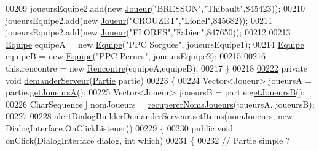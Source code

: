 \begin{DoxyCode}
00209         joueursEquipe2.add(\textcolor{keyword}{new} \hyperlink{classcom_1_1example_1_1area_1_1_joueur}{Joueur}(\textcolor{stringliteral}{"BRESSON"},\textcolor{stringliteral}{"Thibault"},845423));
00210         joueursEquipe2.add(\textcolor{keyword}{new} \hyperlink{classcom_1_1example_1_1area_1_1_joueur}{Joueur}(\textcolor{stringliteral}{"CROUZET"},\textcolor{stringliteral}{"Lionel"},845682));
00211         joueursEquipe2.add(\textcolor{keyword}{new} \hyperlink{classcom_1_1example_1_1area_1_1_joueur}{Joueur}(\textcolor{stringliteral}{"FLORES"},\textcolor{stringliteral}{"Fabien"},847650));
00212 
00213         \hyperlink{classcom_1_1example_1_1area_1_1_equipe}{Equipe} equipeA = \textcolor{keyword}{new} \hyperlink{classcom_1_1example_1_1area_1_1_equipe}{Equipe}(\textcolor{stringliteral}{"PPC Sorgues"}, joueursEquipe1);
00214         \hyperlink{classcom_1_1example_1_1area_1_1_equipe}{Equipe} equipeB = \textcolor{keyword}{new} \hyperlink{classcom_1_1example_1_1area_1_1_equipe}{Equipe}(\textcolor{stringliteral}{"PPC Pernes"}, joueursEquipe2);
00215 
00216         this.rencontre = \textcolor{keyword}{new} \hyperlink{classcom_1_1example_1_1area_1_1_rencontre}{Rencontre}(equipeA,equipeB);
00217     \}
00218 
\hyperlink{classcom_1_1example_1_1area_1_1_i_h_m_gestion_rencontre_a34d405f3c30f6d040b2db3a6ee54a2f4}{00222}     \textcolor{keyword}{private} \textcolor{keywordtype}{void} \hyperlink{classcom_1_1example_1_1area_1_1_i_h_m_gestion_rencontre_a34d405f3c30f6d040b2db3a6ee54a2f4}{demanderServeur}(\hyperlink{classcom_1_1example_1_1area_1_1_partie}{Partie} partie)
00223     \{
00224         Vector<Joueur> joueursA = partie.\hyperlink{classcom_1_1example_1_1area_1_1_partie_a0f944de317206d9b99f9ffc7146a43ef}{getJoueursA}();
00225         Vector<Joueur> joueursB = partie.\hyperlink{classcom_1_1example_1_1area_1_1_partie_a3c6b981de54d03eeb553919983ee3be8}{getJoueursB}();
00226         CharSequence[] nomJoueurs = \hyperlink{classcom_1_1example_1_1area_1_1_i_h_m_gestion_rencontre_ae68b1e5d73d33d01e622a736a25da731}{recupererNomsJoueurs}(joueursA, joueursB);
00227 
00228         \hyperlink{classcom_1_1example_1_1area_1_1_i_h_m_gestion_rencontre_a47ed7018b2af1ac9197715b9008a34a5}{alertDialogBuilderDemanderServeur}.setItems(nomJoueurs, \textcolor{keyword}{new} 
      DialogInterface.OnClickListener()
00229         \{
00230             \textcolor{keyword}{public} \textcolor{keywordtype}{void} onClick(DialogInterface dialog, \textcolor{keywordtype}{int} which)
00231             \{
00232                 \textcolor{comment}{// Partie simple ?}

\end{DoxyCode}
